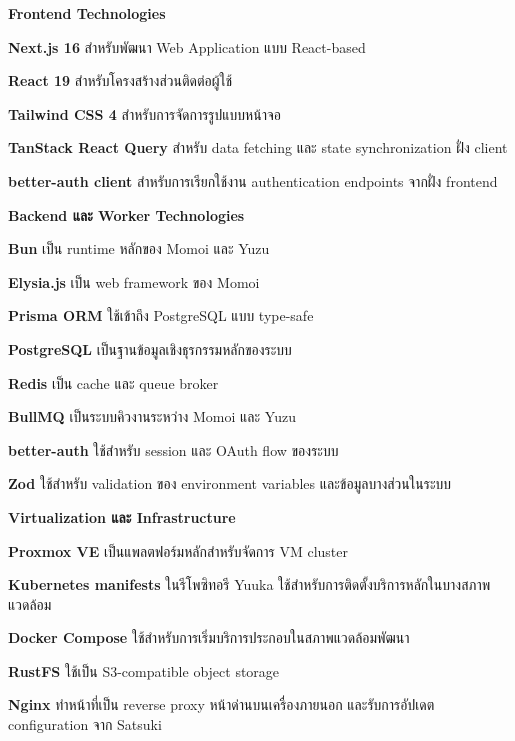 \vspace{0.5em}
\textbf{Frontend Technologies}
\vspace{0.5em}

\begin{mycustomenum2}
    \item \textbf{Next.js 16} สำหรับพัฒนา Web Application แบบ React-based
    \item \textbf{React 19} สำหรับโครงสร้างส่วนติดต่อผู้ใช้
    \item \textbf{Tailwind CSS 4} สำหรับการจัดการรูปแบบหน้าจอ
    \item \textbf{TanStack React Query} สำหรับ data fetching และ state synchronization ฝั่ง client
    \item \textbf{better-auth client} สำหรับการเรียกใช้งาน authentication endpoints จากฝั่ง frontend
\end{mycustomenum2}

\vspace{0.5em}
\textbf{Backend และ Worker Technologies}
\vspace{0.5em}

\begin{mycustomenum2}
    \item \textbf{Bun} เป็น runtime หลักของ Momoi และ Yuzu
    \item \textbf{Elysia.js} เป็น web framework ของ Momoi
    \item \textbf{Prisma ORM} ใช้เข้าถึง PostgreSQL แบบ type-safe
    \item \textbf{PostgreSQL} เป็นฐานข้อมูลเชิงธุรกรรมหลักของระบบ
    \item \textbf{Redis} เป็น cache และ queue broker
    \item \textbf{BullMQ} เป็นระบบคิวงานระหว่าง Momoi และ Yuzu
    \item \textbf{better-auth} ใช้สำหรับ session และ OAuth flow ของระบบ
    \item \textbf{Zod} ใช้สำหรับ validation ของ environment variables และข้อมูลบางส่วนในระบบ
\end{mycustomenum2}

\vspace{0.5em}
\textbf{Virtualization และ Infrastructure}
\vspace{0.5em}

\begin{mycustomenum2}
    \item \textbf{Proxmox VE} เป็นแพลตฟอร์มหลักสำหรับจัดการ VM cluster
    \item \textbf{Kubernetes manifests} ในรีโพซิทอรี Yuuka ใช้สำหรับการติดตั้งบริการหลักในบางสภาพแวดล้อม
    \item \textbf{Docker Compose} ใช้สำหรับการเริ่มบริการประกอบในสภาพแวดล้อมพัฒนา
    \item \textbf{RustFS} ใช้เป็น S3-compatible object storage
    \item \textbf{Nginx} ทำหน้าที่เป็น reverse proxy หน้าด่านบนเครื่องภายนอก และรับการอัปเดต configuration จาก Satsuki
\end{mycustomenum2}

